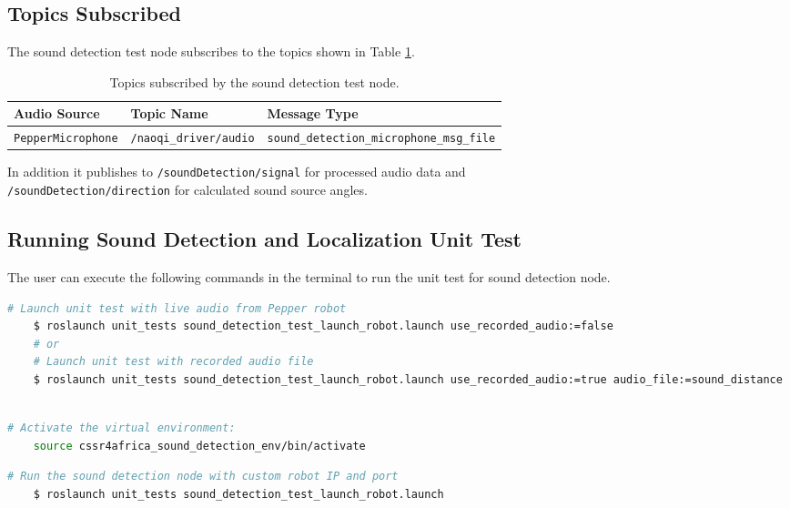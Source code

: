 \documentclass{CSSRforAfrica}
\begin{document}
\subsection*{Topics Subscribed}
The sound detection test node subscribes to the topics shown in Table \ref{Table: topics subscribed unit test node}.
\begin{table}[!h]
	\centering
	{\fontsize{9.0}{12.0}\selectfont %
		\begin{tabularx}{\linewidth}{| l | l | X |}
			\hline
			\rowcolor{blue!20}
			\textbf{Audio Source} & \textbf{Topic Name} & \textbf{Message Type} \\
			\hline
			\texttt{PepperMicrophone} & \texttt{/naoqi\_driver/audio} & \texttt{sound\_detection\_microphone\_msg\_file} \\
			\hline
		\end{tabularx}
	}
	\caption{Topics subscribed by the sound detection test node.}
	\label{Table: topics subscribed unit test node}
\end{table}

In addition it publishes to \texttt{/soundDetection/signal} for processed audio data and \\
 \texttt{/soundDetection/direction} for calculated sound source angles.

\subsection*{Running Sound Detection and Localization Unit Test}
The user can execute the following commands in the terminal to run the unit test for sound detection node.
\begin{lstlisting}[style=withoutNumbering, language=bash]
	# Launch unit test with live audio from Pepper robot
	$ roslaunch unit_tests sound_detection_test_launch_robot.launch use_recorded_audio:=false
	# or
	# Launch unit test with recorded audio file
	$ roslaunch unit_tests sound_detection_test_launch_robot.launch use_recorded_audio:=true audio_file:=sound_distance
	
\end{lstlisting}
\begin{lstlisting}[style=withoutNumbering, language=bash]
	# Activate the virtual environment:
	source cssr4africa_sound_detection_env/bin/activate
\end{lstlisting}
\begin{lstlisting}[style=withoutNumbering, language=bash]
	# Run the sound detection node with custom robot IP and port
	$ roslaunch unit_tests sound_detection_test_launch_robot.launch
\end{lstlisting}
\end{document}
